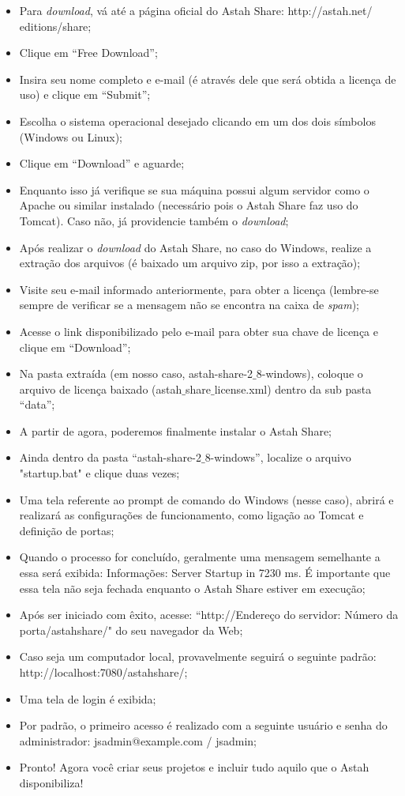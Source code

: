 \documentclass[12pt,a4paper]{article}
\begin{document}
\begin{itemize}

\item Para \textit{download}, vá até a página oficial do Astah Share: http://astah.net/
editions/share;
\item Clique em “Free Download”;
\item Insira seu nome completo e e-mail (é através dele que será obtida a licença de uso) e clique em “Submit”;
\item Escolha o sistema operacional desejado clicando em um dos dois símbolos (Windows ou Linux);
\item Clique em “Download” e aguarde;
\item Enquanto isso já verifique se sua máquina possui algum servidor como o Apache ou similar instalado (necessário pois o Astah Share faz uso do Tomcat). Caso não, já providencie também o \textit{download};
\item Após realizar o \textit{download} do Astah Share, no caso do Windows, realize a extração dos arquivos (é baixado um arquivo zip, por isso a extração);
\item Visite seu e-mail informado anteriormente, para obter a licença (lembre-se sempre de verificar se a mensagem não se encontra na caixa de \textit{spam});
\item Acesse o link disponibilizado pelo e-mail para obter sua chave de licença e clique em “Download”;
\item Na pasta extraída (em nosso caso, astah-share-2$\_$8-windows), coloque o 
arquivo de licença baixado (astah$\_$share$\_$license.xml) dentro da sub pasta “data”;
\item A partir de agora, poderemos finalmente instalar o Astah Share;
\item Ainda dentro da pasta “astah-share-2$\_$8-windows”, localize o arquivo "startup.bat" e clique duas vezes;
\item Uma tela referente ao prompt de comando do Windows (nesse caso), abrirá e realizará as configurações de funcionamento, como ligação ao Tomcat e definição de portas;
\item Quando o processo for concluído, geralmente uma mensagem semelhante a essa será exibida: Informações: Server Startup in 7230 ms. É importante que essa tela não seja fechada enquanto o Astah Share estiver em execução;
\item Após ser iniciado com êxito, acesse: “http://Endereço do servidor: Número da porta/astahshare/" do seu navegador da Web;
\item Caso seja um computador local, provavelmente seguirá o seguinte padrão: http://localhost:7080/astahshare/;
\item Uma tela de login é exibida;
\item Por padrão, o primeiro acesso é realizado com a seguinte usuário e senha do administrador: jsadmin@example.com / jsadmin;
\item Pronto! Agora você criar seus projetos e incluir tudo aquilo que o Astah disponibiliza!

\end{itemize}
\end{document}
